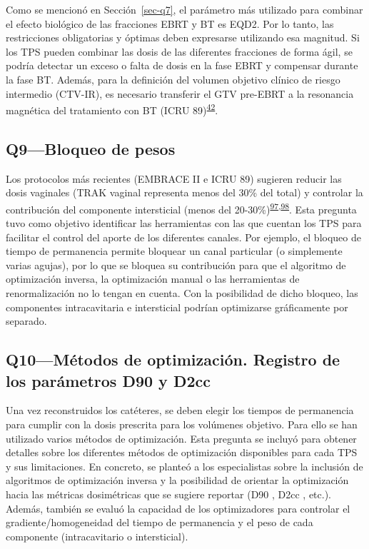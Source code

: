 \documentclass[
  a4paper,
]{scrreprt}
\begin{document}
Como se mencionó en Sección~\ref{sec-q7}, el parámetro más utilizado
para combinar el efecto biológico de las fracciones EBRT y BT es EQD2.
Por lo tanto, las restricciones obligatorias y óptimas deben expresarse
utilizando esa magnitud. Si los TPS pueden combinar las dosis de las
diferentes fracciones de forma ágil, se podría detectar un exceso o
falta de dosis en la fase EBRT y compensar durante la fase BT. Además,
para la definición del volumen objetivo clínico de riesgo intermedio
(CTV-IR), es necesario transferir el GTV pre-EBRT a la resonancia
magnética del tratamiento con BT (ICRU
89)\textsuperscript{\protect\hyperlink{ref-ICRU89}{42}}.

\hypertarget{sec-q9}{%
\subsection{Q9---Bloqueo de pesos}\label{sec-q9}}

Los protocolos más recientes (EMBRACE II e ICRU 89) sugieren reducir las
dosis vaginales (TRAK vaginal representa menos del 30\% del total) y
controlar la contribución del componente intersticial (menos del
20-30\%)\textsuperscript{\protect\hyperlink{ref-prescrib2013}{97},\protect\hyperlink{ref-potter2018}{98}}.
Esta pregunta tuvo como objetivo identificar las herramientas con las
que cuentan los TPS para facilitar el control del aporte de los
diferentes canales. Por ejemplo, el bloqueo de tiempo de permanencia
permite bloquear un canal particular (o simplemente varias agujas), por
lo que se bloquea su contribución para que el algoritmo de optimización
inversa, la optimización manual o las herramientas de renormalización no
lo tengan en cuenta. Con la posibilidad de dicho bloqueo, las
componentes intracavitaria e intersticial podrían optimizarse
gráficamente por separado.

\hypertarget{sec-q10}{%
\subsection{Q10---Métodos de optimización. Registro de los parámetros
D90 y D2cc}\label{sec-q10}}

Una vez reconstruidos los catéteres, se deben elegir los tiempos de
permanencia para cumplir con la dosis prescrita para los volúmenes
objetivo. Para ello se han utilizado varios métodos de optimización.
Esta pregunta se incluyó para obtener detalles sobre los diferentes
métodos de optimización disponibles para cada TPS y sus limitaciones. En
concreto, se planteó a los especialistas sobre la inclusión de
algoritmos de optimización inversa y la posibilidad de orientar la
optimización hacia las métricas dosimétricas que se sugiere reportar
(D90 , D2cc , etc.). Además, también se evaluó la capacidad de los
optimizadores para controlar el gradiente/homogeneidad del tiempo de
permanencia y el peso de cada componente (intracavitario o
intersticial).
\end{document}
